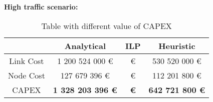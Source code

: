 \vspace{11pt}
\textbf{High traffic scenario:}\\

\begin{table}[h!]
\centering
\begin{tabular}{| c | c | c | c |}
 \hline
   & Analytical & ILP & Heuristic \\
 \hline\hline
 Link Cost & 1 200 524 000 \euro &  \euro & 530 520 000 \euro \\
 Node Cost & 127 679 396 \euro &  \euro & 112 201 800 \euro \\
 CAPEX & \textbf{1 328 203 396 \euro} & \textbf{ \euro} & \textbf{642 721 800 \euro} \\
 \hline
\end{tabular}
\caption{Table with different value of CAPEX }
\label{table_comparative_transp_protec_ref_3}
\end{table}

